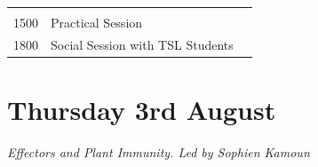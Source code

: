 \documentclass[12pt,]{book}
\theoremstyle{definition}
\theoremstyle{definition}
\theoremstyle{remark}
\begin{document}
\begin{longtable}[]{@{}lll@{}}
\begin{minipage}[t]{0.39\columnwidth}
\strut
\end{minipage}\tabularnewline
\begin{minipage}[t]{0.09\columnwidth}\raggedright\strut
1500\strut
\end{minipage} & \begin{minipage}[t]{0.39\columnwidth}\raggedright\strut
Practical Session\strut
\end{minipage} & \begin{minipage}[t]{0.39\columnwidth}\raggedright\strut
\strut
\end{minipage}\tabularnewline
\begin{minipage}[t]{0.09\columnwidth}\raggedright\strut
1800\strut
\end{minipage} & \begin{minipage}[t]{0.39\columnwidth}\raggedright\strut
Social Session with TSL Students\strut
\end{minipage} & \begin{minipage}[t]{0.39\columnwidth}\raggedright\strut
\strut
\end{minipage}\tabularnewline
\bottomrule
\end{longtable}

\section*{Thursday 3rd August}\label{thursday-3rd-august}

\emph{Effectors and Plant Immunity. Led by Sophien Kamoun}
\end{document}
